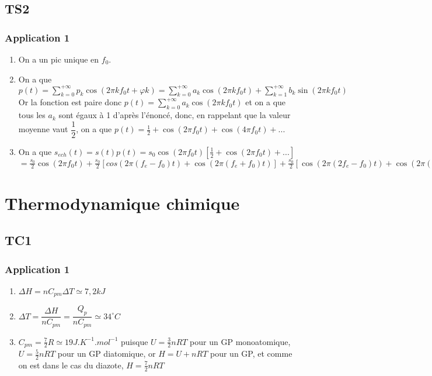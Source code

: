 \documentclass[a4paper,12pt]{book}
\begin{document}
\section{TS2}
\subsection{Application 1}
\begin{enumerate}
\item On a un pic unique en $f_0$.
\item On a que $p(t)=\sum\limits_{k=0}^{+\infty}p_k\cos(2\pi kf_0t+\varphi k) = \sum\limits_{k=0}^{+\infty}a_k\cos(2\pi kf_0t) + \sum\limits_{k=1}^{+\infty} b_k\sin(2\pi kf_0t)$ Or la fonction est paire donc $p(t)= \sum\limits_{k=0}^{+\infty}a_k\cos(2\pi kf_0t)$ et on a que tous les $a_k$ sont égaux à 1 d'après l'énoncé, donc, en rappelant que la valeur moyenne vaut $\dfrac{1}{2}$, on a que $p(t)=\frac{1}{2} +\cos(2\pi f_0t) + \cos(4\pi f_0t) +...$
\item On a que $s_{ech}(t) = s(t)p(t) = s_0\cos(2\pi f_0t)\left[\frac{1}{2}+\cos(2\pi f_0t)+...\right]$
\\ $ = \frac{s_0}{2}\cos(2\pi f_0t) + \frac{s_0}{2}[cos(2\pi (f_e-f_0)t)+\cos(2\pi (f_e+f_0)t)] + \frac{s_0}{2}[\cos(2\pi (2f_e-f_0)t)+\cos(2\pi(2f_E+f_0)t)]+...$
\end{enumerate}




























\chapter{Thermodynamique chimique}
\section{TC1}
\subsection{Application 1}
\begin{enumerate}
\item $\Delta H = nC_{pm}\Delta T \simeq 7,2kJ$
\item $\Delta T = \dfrac{\Delta H}{nC_{pm}}=\dfrac{Q_p}{nC_{pm}}\simeq 34^\circ C$
\item $C_{pm}=\frac{7}{2}R\simeq 19J.K^{-1}.mol^{-1}$ puisque $U=\frac{3}{2}nRT$ pour un GP monoatomique, $U=\frac{5}{2}nRT$ pour un GP diatomique, or $H=U+nRT$ pour un GP, et comme on est dans le cas du diazote, $H=\frac{7}{2}nRT$
\end{enumerate}
\end{document}
